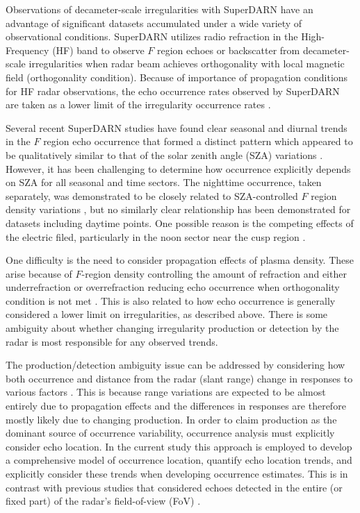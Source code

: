 Observations of decameter-scale irregularities with SuperDARN have an advantage of significant datasets accumulated under a wide variety of observational conditions. SuperDARN utilizes radio refraction in the High-Frequency (HF) band to observe \(F\) region echoes or backscatter from decameter-scale irregularities when radar beam achieves orthogonality with local magnetic field (orthogonality condition). Because of importance of propagation conditions for HF radar observations, the echo occurrence rates observed by SuperDARN are taken as a lower limit of the irregularity occurrence rates \citep{Chisham2007}.


Several recent SuperDARN studies have found clear seasonal and diurnal trends in the \(F\) region echo occurrence that formed a distinct pattern which appeared to be qualitatively similar to that of the solar zenith angle (SZA) variations \citep{Kane2012,Ghezelbash2014a,Ghezelbash2014b}. However, it has been challenging to determine how occurrence explicitly depends on SZA for all seasonal and time sectors. The nighttime occurrence, taken separately, was demonstrated to be closely related to SZA-controlled \(F\) region density  variations \citep{Kane2012}, but no similarly clear relationship has been demonstrated for datasets including daytime points.  One possible reason is the competing effects of the electric filed, particularly in the noon sector near the cusp region \citep{Ghezelbash2014a,Ghezelbash2014b}.

One difficulty is the need to consider propagation effects of plasma density. These arise because of \(F\)-region density controlling the amount of refraction and either underrefraction or overrefraction reducing echo occurrence when orthogonality condition is not met \citep{Milan1997,Danskin2002}. This is also related to how echo occurrence is generally considered a lower limit on irregularities, as described above. There is some ambiguity about whether changing irregularity production or detection by the radar is most responsible for any observed trends.

The production/detection ambiguity issue can be addressed by considering how both occurrence and distance from the radar (slant range) change in responses to various factors \citep{Kane2012,Ghezelbash2014b}. This is because range variations are expected to be almost entirely due to propagation effects and the differences in responses are therefore mostly likely due to changing production. In order to claim production as the dominant source of occurrence variability, occurrence analysis must explicitly consider echo location. In the current study this approach is employed to develop a comprehensive model of occurrence location, quantify echo location trends, and explicitly consider these trends when developing occurrence estimates. This is in contrast with previous studies that considered echoes detected in the entire (or fixed part) of the radar's field-of-view (FoV) \citep[e.g.][]{Kumar2011,Kane2012}.

